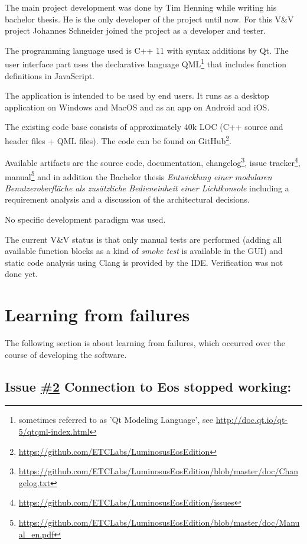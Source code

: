 \documentclass{scrreprt}
\begin{document}
The main project development was done by Tim Henning while writing his bachelor thesis. He is the only developer of the project until now. For this V\&V project Johannes Schneider joined the project as a developer and tester.

The programming language used is C++ 11 with syntax additions by Qt. The user interface part uses the declarative language QML\footnote{ sometimes referred to as 'Qt Modeling Language', see \url{http://doc.qt.io/qt-5/qtqml-index.html}} that includes function definitions in JavaScript.

The application is intended to be used by end users. It runs as a desktop application on Windows and MacOS and as an app on Android and iOS.

The existing code base consists of approximately 40k LOC (C++ source and header files + QML files). The code can be found on GitHub\footnote{\url{https://github.com/ETCLabs/LuminosusEosEdition}}.

Available artifacts are the source code, documentation, changelog\footnote{\url{https://github.com/ETCLabs/LuminosusEosEdition/blob/master/doc/Changelog.txt}}, issue tracker\footnote{\url{https://github.com/ETCLabs/LuminosusEosEdition/issues}}, manual\footnote{\url{https://github.com/ETCLabs/LuminosusEosEdition/blob/master/doc/Manual_en.pdf}} and in addition the Bachelor thesis \textit{Entwicklung einer modularen Benutzeroberfl\"ache als zus\"atzliche Bedieneinheit einer Lichtkonsole} including a requirement analysis and a discussion of the architectural decisions.

No specific development paradigm was used.

The current V\&V status is that only manual tests are performed (adding all available function blocks as a kind of \textit{smoke test} is available in the GUI) and static code analysis using Clang is provided by the IDE. Verification was not done yet.

\section{Learning from failures}

The following section is about learning from failures, which occurred over the course of developing the software.

\subsection{Issue \href{https://github.com/ETCLabs/LuminosusEosEdition/issues/2}{\#2} Connection to Eos stopped working:}
\end{document}
